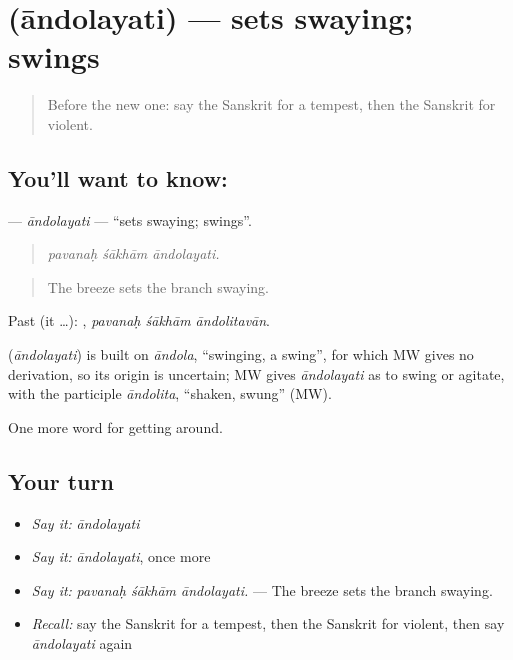 \section[\texorpdfstring{\sk{आन्दोलयति} (āndolayati)}{आन्दोलयति (āndolayati)}]{ (āndolayati) — sets swaying; swings}

\label{lesson:SA-C439-andolayati}



\begin{quote}
Before the new one: say the Sanskrit for a tempest, then the Sanskrit for violent.
\end{quote}

\subsection*{You'll want to know: }
\textbf{} — \emph{āndolayati} — \textquotedblleft{}sets swaying; swings\textquotedblright{}.

\begin{quote}
  
\end{quote}

\begin{quote}
\emph{pavanaḥ śākhām āndolayati.}
\end{quote}

\begin{quote}
The breeze sets the branch swaying.
\end{quote}

Past (it …):   , \emph{pavanaḥ śākhām āndolitavān}.

\begin{cousinweb}
\textbf{} (\emph{āndolayati}) is built on \emph{āndola}, \textquotedblleft{}swinging, a swing\textquotedblright{}, for which MW gives no derivation, so its origin is uncertain; MW gives \emph{āndolayati} as to swing or agitate, with the participle \emph{āndolita}, \textquotedblleft{}shaken, swung\textquotedblright{} (MW).
\end{cousinweb}

\begin{grammarlens}[title={What you've built}]
One more word for getting around.
\end{grammarlens}

\subsection*{Your turn}
\begin{itemize}
\raggedright
  \item \emph{Say it:} \emph{āndolayati}
  \item \emph{Say it:} \emph{āndolayati}, once more
  \item \emph{Say it:} \emph{pavanaḥ śākhām āndolayati.} — The breeze sets the branch swaying.
  \item \emph{Recall:} say the Sanskrit for a tempest, then the Sanskrit for violent, then say \emph{āndolayati} again
\end{itemize}

